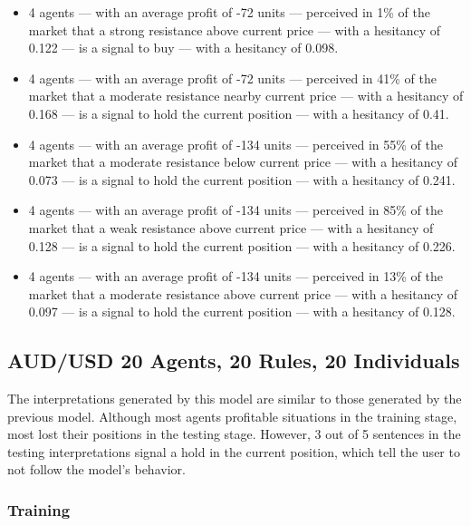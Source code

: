{\small
  \begin{itemize}
  \item 4 agents — with an average profit of -72 units — perceived in 1\% of the
    market that a strong resistance above current price — with a hesitancy of
    0.122 — is a signal to buy — with a hesitancy of 0.098.
  \item 4 agents — with an average profit of -72 units — perceived in 41\% of
    the market that a moderate resistance nearby current price — with a
    hesitancy of 0.168 — is a signal to hold the current position — with a
    hesitancy of 0.41.
  \item 4 agents — with an average profit of -134 units — perceived in 55\% of
    the market that a moderate resistance below current price — with a hesitancy
    of 0.073 — is a signal to hold the current position — with a hesitancy of
    0.241.
  \item 4 agents — with an average profit of -134 units — perceived in 85\% of
    the market that a weak resistance above current price — with a hesitancy of
    0.128 — is a signal to hold the current position — with a hesitancy of
    0.226.
  \item 4 agents — with an average profit of -134 units — perceived in 13\% of
    the market that a moderate resistance above current price — with a hesitancy
    of 0.097 — is a signal to hold the current position — with a hesitancy of
    0.128.
  \end{itemize}
}

\subsection{AUD/USD 20 Agents, 20 Rules, 20 Individuals}
\label{}

The interpretations generated by this model are similar to those generated by
the previous model. Although most agents profitable situations in the training
stage, most lost their positions in the testing stage. However, 3 out of 5
sentences in the testing interpretations signal a hold in the current position,
which tell the user to not follow the model's behavior.

\subsubsection{Training}
\label{}

